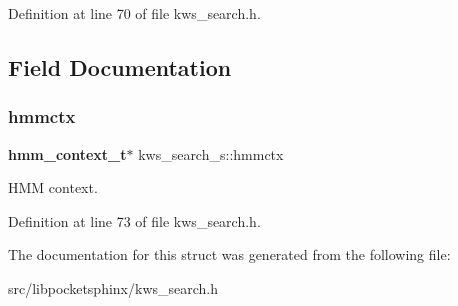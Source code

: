 Definition at line 70 of file kws\+\_\+search.\+h.



\subsection{Field Documentation}
\mbox{\label{structkws__search__s_a0069d57702f921cbd1e2093148e7b672}} 
\subsubsection{hmmctx}
{\footnotesize\ttfamily \textbf{ hmm\+\_\+context\+\_\+t}$\ast$ kws\+\_\+search\+\_\+s\+::hmmctx}



H\+MM context. 



Definition at line 73 of file kws\+\_\+search.\+h.



The documentation for this struct was generated from the following file\+:\begin{DoxyCompactItemize}
\item 
src/libpocketsphinx/kws\+\_\+search.\+h\end{DoxyCompactItemize}
